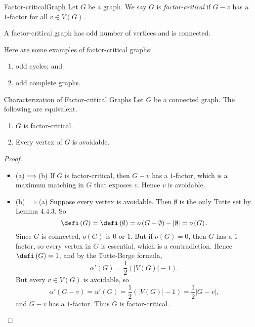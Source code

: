 \documentclass[co342]{subfiles}
\begin{document}
    \begin{definition}{Factor-critical}{Graph}
        Let $G$ be a graph. We say $G$ is \emph{factor-critical} if $G-v$ has a $1$-factor for all $v\in V\left( G \right)$.
    \end{definition}

    \np A factor-critical graph has odd number of vertices and is connected.

    \ex Here are some examples of factor-critical graphs:
    \begin{enumerate}
        \item odd cycles; and
        \item odd complete graphs.
    \end{enumerate}

    \begin{prop}{Characterization of Factor-critical Graphs}
        Let $G$ be a connected graph. The following are equivalent.
        \begin{enumerate}
            \item $G$ is factor-critical.
            \item Every vertex of $G$ is avoidable.
        \end{enumerate}
    \end{prop}

    \begin{proof}
        \begin{itemize}
            \item (a)$\implies$(b) If $G$ is factor-critical, then $G-v$ has a $1$-factor, which is a maximum matching in $G$ that exposes $v$. Hence $v$ is avoidable.
            \item (b)$\implies$(a) Suppose every vertex is avoidable. Then $\emptyset$ is the only Tutte set by Lemma 4.4.3. So
                \begin{equation*}
                    \defi\left( G \right)=\defi\left( \emptyset \right) = o\left( G-\emptyset \right)-\left| \emptyset \right|=o\left( G \right).
                \end{equation*}
                Since $G$ is connected, $o\left( G \right)$ is $0$ or $1$. But if $o\left( G \right)=0$, then $G$ has a $1$-factor, so every vertex in $G$ is essential, which is a contradiction. Hence $\defi\left( G \right)=1$, and by the Tutte-Berge formula,
                \begin{equation*}
                    \alpha'\left( G \right)=\frac{1}{2} \left( \left| V\left( G \right) \right|-1 \right).
                \end{equation*}
                But every $v\in V\left( G \right)$ is avoidable, so
                \begin{equation*}
                    \alpha'\left( G-v \right)=\alpha'\left( G \right) = \frac{1}{2}\left( \left| V\left( G \right) \right|-1 \right) = \frac{1}{2} \left| G-v \right|,
                \end{equation*}
                and $G-v$ has a $1$-factor. Thus $G$ is factor-critical. \qqedsym
        \end{itemize} 
    \end{proof}
\end{document}
